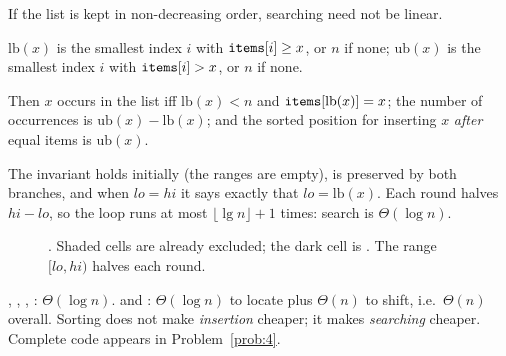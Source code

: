 If the list is kept in non-decreasing order, searching need not be linear.

\begin{definition}
$\mathrm{lb}(x)$ is the smallest index $i$ with $\texttt{items}[i]\ge x$, or $n$ if none;
$\mathrm{ub}(x)$ is the smallest index $i$ with $\texttt{items}[i]>x$, or $n$ if none.
\end{definition}

Then $x$ occurs in the list iff $\mathrm{lb}(x)<n$ and $\texttt{items}[\mathrm{lb}(x)]=x$;
the number of occurrences is $\mathrm{ub}(x)-\mathrm{lb}(x)$; and the sorted position for
inserting $x$ \emph{after} equal items is $\mathrm{ub}(x)$.


\begin{theorem}
The invariant holds initially (the ranges are empty), is preserved by both branches, and
when $\mathit{lo}=\mathit{hi}$ it says exactly that $\mathit{lo}=\mathrm{lb}(x)$. Each
round halves $\mathit{hi}-\mathit{lo}$, so the loop runs at most $\lfloor\lg n\rfloor+1$
times: search is $\Theta(\log n)$.
\end{theorem}

\begin{figure}[ht]\centering
{}
\caption{. Shaded cells are already excluded; the dark cell is
. The range $[lo,hi)$ halves each round.}
\end{figure}

\begin{proposition}
, , , : $\Theta(\log n)$. 
and : $\Theta(\log n)$ to locate plus $\Theta(n)$ to shift, i.e.\ $\Theta(n)$
overall. Sorting does not make \emph{insertion} cheaper; it makes \emph{searching}
cheaper. Complete code appears in Problem~\ref{prob:4}.
\end{proposition}

